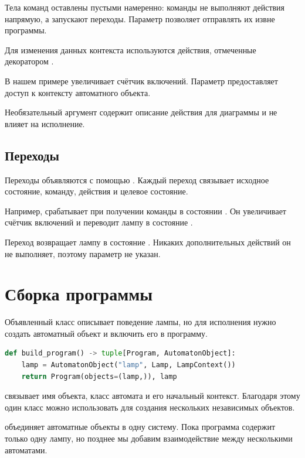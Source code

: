Тела команд оставлены пустыми намеренно: команды
не выполняют действия напрямую, а запускают переходы.
Параметр  позволяет отправлять
их извне программы.

Для изменения данных контекста используются действия,
отмеченные декоратором .

В нашем примере 
увеличивает счётчик включений. Параметр 
предоставляет доступ к контексту автоматного объекта.

Необязательный аргумент  содержит описание
действия для диаграммы и не влияет на исполнение.

\subsection{Переходы}

Переходы объявляются с помощью .
Каждый переход связывает исходное состояние,
команду, действия и целевое состояние.

Например,  срабатывает при получении
команды  в состоянии .
Он увеличивает счётчик включений и переводит
лампу в состояние .

Переход  возвращает лампу в состояние
. Никаких дополнительных действий
он не выполняет, поэтому параметр 
не указан.

\section{Сборка программы}

Объявленный класс описывает поведение лампы,
но для исполнения нужно создать автоматный объект
и включить его в программу.

\begin{lstlisting}[language=Python,numbers=none]
def build_program() -> tuple[Program, AutomatonObject]:
    lamp = AutomatonObject("lamp", Lamp, LampContext())
    return Program(objects=(lamp,)), lamp
\end{lstlisting}

 связывает имя объекта, класс
автомата и его начальный контекст. Благодаря этому
один класс можно использовать для создания
нескольких независимых объектов.

 объединяет автоматные объекты
в одну систему. Пока программа содержит только
одну лампу, но позднее мы добавим взаимодействие
между несколькими автоматами.

